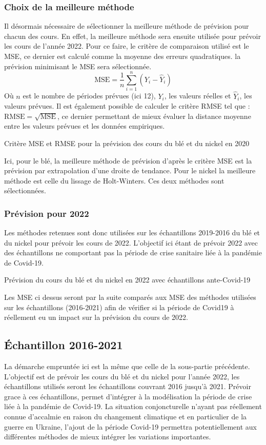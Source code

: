 \subsubsection{Choix de la meilleure méthode}
Il désormais nécessaire de sélectionner la meilleure méthode de prévision pour chacun des cours. En effet, la meilleure méthode sera ensuite utilisée pour prévoir les
cours de l'année 2022. Pour ce faire, le critère de comparaison utilisé est le MSE, ce dernier est calculé comme la moyenne des erreurs quadratiques. la prévision 
minimisant le MSE sera sélectionnée.
\begin{equation*}
    \text{MSE} = \frac{1}{n} \sum_{i=1}^{n} (Y_{i} - \hat{Y}_{i})
\end{equation*}
Où $n$ est le nombre de périodes prévues (ici 12), $Y_{i}$, les valeurs réelles et $\hat{Y}_{i}$, les valeurs prévues. Il est également possible de calculer le critère
RMSE tel que : $\text{RMSE} = \sqrt{\text{MSE}}$, ce dernier permettant de mieux évaluer la distance moyenne entre les valeurs prévues et les données empiriques.
\begin{table}[H]
    \centering
    \caption{Critère MSE et RMSE pour la prévision des cours du blé et du nickel en 2020}
    \sffamily
    
\end{table}
Ici, pour le blé, la meilleure méthode de prévision d'après le critère MSE est la prévision par extrapolation d'une droite de tendance. Pour le nickel la meilleure méthode
est celle du lissage de Holt-Winters. Ces deux méthodes sont sélectionnées.
\subsubsection{Prévision pour 2022}
Les méthodes retenues sont donc utilisées sur les échantillons 2019-2016 du blé et du nickel pour prévoir les cours de 2022. L'objectif ici étant de prévoir 2022 avec des
échantillons ne comportant pas la période de crise sanitaire liée à la pandémie de Covid-19.
\begin{table}[H]
    \centering
    \caption{Prévision du cours du blé et du nickel en 2022 avec échantillons ante-Covid-19 }
    \sffamily
    
\end{table}
Les MSE ci dessus seront par la suite comparés aux MSE des méthodes utilisées sur les échantillons (2016-2021) afin de vérifier si la période de Covid19 à réellement eu un impact sur la prévision du cours de 2022.
\subsection{Échantillon 2016-2021}
La démarche empruntée ici est la même que celle de la sous-partie précédente. L'objectif est de prévoir les cours du blé et du nickel
pour l'année 2022, les échantillons utilisés seront les échantillons couvrant 2016 jusqu'à 2021. Prévoir grace à ces échantillons, permet d'intégrer à la
modélisation la période de crise liée à la pandémie de Covid-19. La situation conjoncturelle n'ayant pas réellement connue d'accalmie en raison du changement climatique et 
en particulier de la guerre en Ukraine, l'ajout de la période Covid-19 permettra potentiellement aux différentes méthodes de mieux intégrer les variations importantes.
